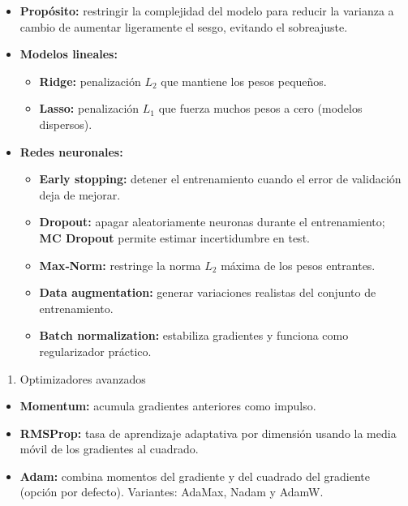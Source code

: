 \documentclass[12pt]{book} %
\providecommand{\tightlist}{%
  \setlength{\itemsep}{0pt}\setlength{\parskip}{0pt}}
\begin{document}
\begin{itemize}
\tightlist
\item
  \textbf{Propósito:} restringir la complejidad del modelo para reducir
  la varianza a cambio de aumentar ligeramente el sesgo, evitando el
  sobreajuste.
\item
  \textbf{Modelos lineales:}

  \begin{itemize}
  \tightlist
  \item
    \textbf{Ridge:} penalización \(L_2\) que mantiene los pesos
    pequeños.
  \item
    \textbf{Lasso:} penalización \(L_1\) que fuerza muchos pesos a cero
    (modelos dispersos).
  \end{itemize}
\item
  \textbf{Redes neuronales:}

  \begin{itemize}
  \tightlist
  \item
    \textbf{Early stopping:} detener el entrenamiento cuando el error de
    validación deja de mejorar.
  \item
    \textbf{Dropout:} apagar aleatoriamente neuronas durante el
    entrenamiento; \textbf{MC Dropout} permite estimar incertidumbre en
    test.
  \item
    \textbf{Max‑Norm:} restringe la norma \(L_2\) máxima de los pesos
    entrantes.
  \item
    \textbf{Data augmentation:} generar variaciones realistas del
    conjunto de entrenamiento.
  \item
    \textbf{Batch normalization:} estabiliza gradientes y funciona como
    regularizador práctico.
  \end{itemize}
\end{itemize}

\begin{enumerate}
\def\labelenumi{\arabic{enumi}.}
\setcounter{enumi}{2}
\tightlist
\item
  Optimizadores avanzados
\end{enumerate}

\begin{itemize}
\tightlist
\item
  \textbf{Momentum:} acumula gradientes anteriores como impulso.
\item
  \textbf{RMSProp:} tasa de aprendizaje adaptativa por dimensión usando
  la media móvil de los gradientes al cuadrado.
\item
  \textbf{Adam:} combina momentos del gradiente y del cuadrado del
  gradiente (opción por defecto). Variantes: AdaMax, Nadam y AdamW.
\end{itemize}
\end{document}

